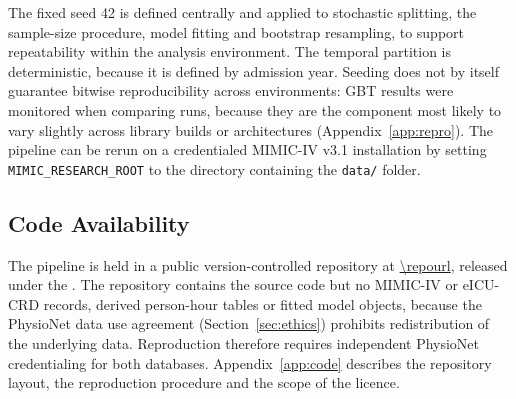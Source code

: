 The fixed seed 42 is defined centrally and applied to stochastic splitting,
the sample-size procedure, model fitting and bootstrap resampling, to support
repeatability within the analysis environment. The temporal partition is
deterministic, because it is defined by admission year. Seeding does not by
itself guarantee bitwise reproducibility across environments: GBT results were
monitored when comparing runs, because they are the component most likely to
vary slightly across library builds or architectures (Appendix~\ref{app:repro}).
The pipeline can be rerun on a credentialed MIMIC-IV v3.1 installation by
setting \texttt{MIMIC\_RESEARCH\_ROOT} to the directory containing the
\texttt{data/} folder.

\subsection{Code Availability}
\label{sec:code_availability}

The pipeline is held in a public version-controlled repository at
\url{\repourl}, released under the \repolicence. The repository contains the source code but no MIMIC-IV or eICU-CRD records,
derived person-hour tables or fitted model objects, because the PhysioNet data
use agreement (Section~\ref{sec:ethics}) prohibits redistribution of the
underlying data. Reproduction therefore requires independent PhysioNet
credentialing for both databases. Appendix~\ref{app:code} describes the
repository layout, the reproduction procedure and the scope of the licence.
